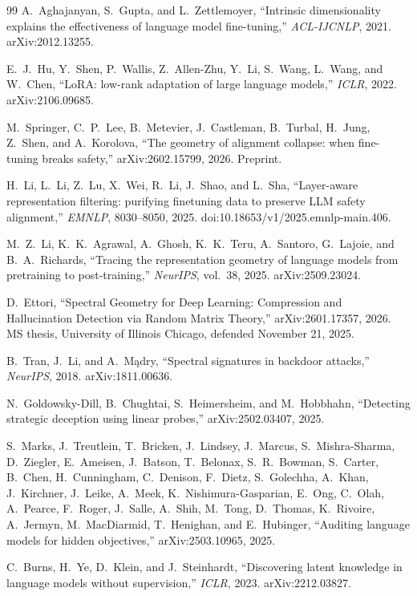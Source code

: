 \documentclass[11pt]{article}
\theoremstyle{definition}
\theoremstyle{remark}
\begin{document}
\begin{thebibliography}{99}
A.~Aghajanyan, S.~Gupta, and L.~Zettlemoyer,
``Intrinsic dimensionality explains the effectiveness of language model fine-tuning,''
\emph{ACL-IJCNLP}, 2021. arXiv:2012.13255.

E.~J.~Hu, Y.~Shen, P.~Wallis, Z.~Allen-Zhu, Y.~Li, S.~Wang, L.~Wang, and W.~Chen,
``LoRA: low-rank adaptation of large language models,''
\emph{ICLR}, 2022. arXiv:2106.09685.

M.~Springer, C.~P.~Lee, B.~Metevier, J.~Castleman, B.~Turbal, H.~Jung,
Z.~Shen, and A.~Korolova,
``The geometry of alignment collapse: when fine-tuning breaks safety,''
arXiv:2602.15799, 2026. Preprint.

H.~Li, L.~Li, Z.~Lu, X.~Wei, R.~Li, J.~Shao, and L.~Sha,
``Layer-aware representation filtering: purifying finetuning data to preserve LLM safety alignment,''
\emph{EMNLP}, 8030--8050, 2025. doi:10.18653/v1/2025.emnlp-main.406.

M.~Z.~Li, K.~K.~Agrawal, A.~Ghosh, K.~K.~Teru, A.~Santoro, G.~Lajoie, and B.~A.~Richards,
``Tracing the representation geometry of language models from pretraining to post-training,''
\emph{NeurIPS}, vol.~38, 2025. arXiv:2509.23024.

D.~Ettori,
``Spectral Geometry for Deep Learning: Compression and Hallucination Detection via Random
Matrix Theory,''
arXiv:2601.17357, 2026. MS thesis, University of Illinois Chicago,
defended November 21, 2025.

B.~Tran, J.~Li, and A.~M\k{a}dry,
``Spectral signatures in backdoor attacks,''
\emph{NeurIPS}, 2018. arXiv:1811.00636.

N.~Goldowsky-Dill, B.~Chughtai, S.~Heimersheim, and M.~Hobbhahn,
``Detecting strategic deception using linear probes,''
arXiv:2502.03407, 2025.

S.~Marks, J.~Treutlein, T.~Bricken, J.~Lindsey, J.~Marcus,
S.~Mishra-Sharma, D.~Ziegler, E.~Ameisen, J.~Batson, T.~Belonax,
S.~R.~Bowman, S.~Carter, B.~Chen, H.~Cunningham, C.~Denison,
F.~Dietz, S.~Golechha, A.~Khan, J.~Kirchner, J.~Leike, A.~Meek,
K.~Nishimura-Gasparian, E.~Ong, C.~Olah, A.~Pearce, F.~Roger,
J.~Salle, A.~Shih, M.~Tong, D.~Thomas, K.~Rivoire, A.~Jermyn,
M.~MacDiarmid, T.~Henighan, and E.~Hubinger,
``Auditing language models for hidden objectives,''
arXiv:2503.10965, 2025.

C.~Burns, H.~Ye, D.~Klein, and J.~Steinhardt,
``Discovering latent knowledge in language models without supervision,''
\emph{ICLR}, 2023. arXiv:2212.03827.


\end{thebibliography}
\end{document}

